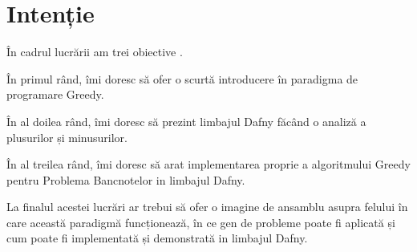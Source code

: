 \chapter*{Intenție} 

În cadrul lucrării am trei obiective .\par
În primul rând, îmi doresc să ofer o scurtă introducere în paradigma de programare Greedy.\par
În al doilea rând, îmi doresc să prezint limbajul Dafny făcând o analiză a plusurilor și minusurilor.\par
În al treilea rând, îmi doresc să arat implementarea proprie a algoritmului Greedy pentru Problema Bancnotelor in limbajul Dafny.\par

La finalul acestei lucrări ar trebui să ofer o imagine de ansamblu 
asupra felului în care această paradigmă funcționează, în ce gen de probleme poate fi aplicată și cum poate fi
implementată și demonstrată in limbajul Dafny. 